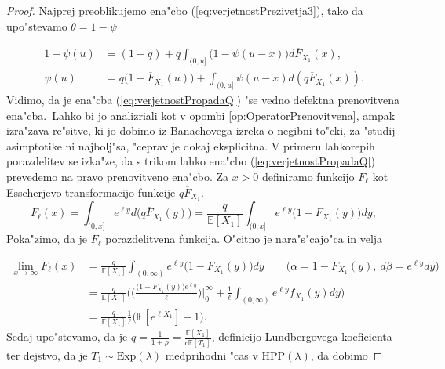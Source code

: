\documentclass[12pt, a4paper, reqno]{amsart}
\theoremstyle{definition}
\theoremstyle{plain}
\newcommand{\E}{\mathbb{E}}
\newcommand{\1}{\mathds{1}}
\begin{document}
            \begin{proof} 
                Najprej preoblikujemo ena"cbo (\ref{eq:verjetnostPrezivetja3}), tako da 
                upo"stevamo $\theta = 1 - \psi$

                \begin{align}
                    1 - \psi(u) &= (1 - q) + q\int_{(0, u]}\bigl(1 - \psi(u - x)\bigr)d\overline{F}_{X_1}(x), \nonumber \\
                    \psi(u) &= q\bigl(1 - \overline{F}_{X_1}(u)\bigr) + \int_{(0, u]}\psi(u - x)d\left(q\overline{F}_{X_1}(x)\right). \label{eq:verjetnostPropadaQ}
                \end{align}
                Vidimo, da je ena"cba (\ref{eq:verjetnostPropadaQ}) "se vedno defektna prenovitvena ena"cba.\ 
                Lahko bi jo analizriali kot v opombi \ref{op:OperatorPrenovitvena}, ampak 
                izra"zava re"sitve, ki jo dobimo iz Banachovega izreka o negibni to"cki, za "studij 
                asimptotike ni najbolj"sa, "ceprav je dokaj eksplicitna. 
                V primeru lahkorepih porazdelitev se izka"ze, da s trikom lahko ena"cbo (\ref{eq:verjetnostPropadaQ}) 
                prevedemo na pravo prenovitveno ena"cbo. Za $x > 0$ 
                definiramo funkcijo $F_\ell$ kot Esscherjevo transformacijo funkcije $q\overline{F}_{X_1}$.
                \begin{equation}
                    F_\ell(x) = \int_{(0, x]}e^{\ell y}d\bigl(q\overline{F}_{X_1}(y)\bigr) = \frac{q}{\E\left[X_1\right]}\int_{(0, x]}e^{\ell y}\bigl(1 - F_{X_1}(y)\bigr)dy, 
                    \label{eq:EsscherjevaTransformacija}
                \end{equation}
                Poka"zimo, da je $F_\ell$ porazdelitvena funkcija. O"citno je nara"s"cajo"ca in velja

                \begin{align*}
                    \lim_{x\to\infty}F_\ell(x) &= \frac{q}{\E\left[X_1\right]}\int_{(0, \infty)}e^{\ell y} \bigl(1 - F_{X_1}(y)\bigr)dy \qquad \bigl(\alpha = 1 - F_{X_1}(y), \ d\beta = e^{\ell y}dy\bigr)\\
                                               &= \frac{q}{\E\left[X_1\right]}\biggl(\biggl(\frac{\bigl(1 - F_{X_1}(y)\bigr)e^{\ell y}}{\ell}\biggr)\Big|_{0}^{\infty} + \frac{1}{\ell}\int_{(0, \infty)}e^{\ell y}f_{X_1}(y)dy\biggr) \\
                                               &= \frac{q}{\E\left[X_1\right]}\frac{1}{\ell}\biggl(\E\left[e^{\ell X_1}\right] - 1\biggr).
                \end{align*}
                Sedaj upo"stevamo, da je $q = \frac{1}{1 + \rho} = \frac{\E\left[X_1\right]}{c\E\left[T_1\right]}$, 
                definicijo Lundbergovega koeficienta ter dejstvo, da je $T_1\sim\text{Exp}(\lambda)$ medprihodni "cas v $\text{HPP}(\lambda)$, da dobimo


\end{proof}
\end{document}
